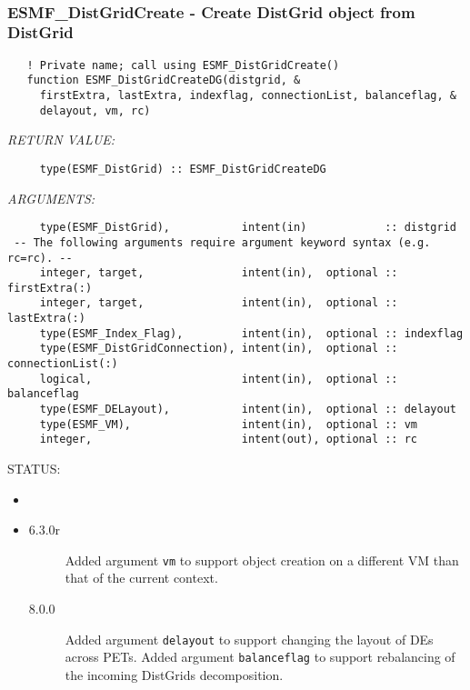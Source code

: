  
\mbox{}\hrulefill\ 
 
\subsubsection [ESMF\_DistGridCreate] {ESMF\_DistGridCreate - Create DistGrid object from DistGrid}


 
\begin{verbatim}   ! Private name; call using ESMF_DistGridCreate()
   function ESMF_DistGridCreateDG(distgrid, &
     firstExtra, lastExtra, indexflag, connectionList, balanceflag, &
     delayout, vm, rc)
           \end{verbatim}{\em RETURN VALUE:}
\begin{verbatim}     type(ESMF_DistGrid) :: ESMF_DistGridCreateDG\end{verbatim}{\em ARGUMENTS:}
\begin{verbatim}     type(ESMF_DistGrid),           intent(in)            :: distgrid
 -- The following arguments require argument keyword syntax (e.g. rc=rc). --
     integer, target,               intent(in),  optional :: firstExtra(:)
     integer, target,               intent(in),  optional :: lastExtra(:)
     type(ESMF_Index_Flag),         intent(in),  optional :: indexflag
     type(ESMF_DistGridConnection), intent(in),  optional :: connectionList(:)
     logical,                       intent(in),  optional :: balanceflag
     type(ESMF_DELayout),           intent(in),  optional :: delayout
     type(ESMF_VM),                 intent(in),  optional :: vm
     integer,                       intent(out), optional :: rc\end{verbatim}
{\sf STATUS:}
   \begin{itemize}
   \item{}
   \item{}
   \begin{description}
   \item[6.3.0r] Added argument {\tt vm} to support object creation on a
                 different VM than that of the current context.
   \item[8.0.0] Added argument {\tt delayout} to support changing the layout of
                DEs across PETs.\newline
                Added argument {\tt balanceflag} to support rebalancing of the
                incoming DistGrids decomposition.
   \end{description}
   \end{itemize}
  

